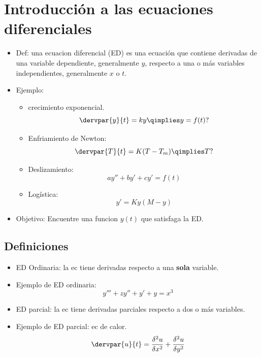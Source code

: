 \section{Introducción a las ecuaciones diferenciales}
\begin{itemize}
    \item Def: una ecuacion diferencial (ED) es una ecuación que contiene derivadas de una variable dependiente, generalmente $y$, respecto a una o más variables independientes, generalmente $x$ o $t$.
    \item Ejemplo: 
        \begin{itemize}
            \item crecimiento exponencial.
                \[
                    \dervpar{y}{t} = ky \qimplies y=f(t)?
                \]
            
            \item Enfriamiento de Newton:
                \[
                  \dervpar{T}{t} = K(T-T_m) \qimplies T?
                \]
            
            \item Deslizamiento: 
                \[
                  ay''+by'+cy'=f(t) 
                \]
            
            \item Logística: 
                \[
                  y'=Ky(M-y)
                \]
        \end{itemize}
    
    \item Objetivo: Encuentre una funcion $y(t)$ que satisfaga la ED.
\end{itemize}

\subsection{Definiciones}
\begin{itemize}
    \item ED Ordinaria: la ec tiene derivadas respecto a una \textbf{sola} variable.
    \item Ejemplo de ED ordinaria: 
        \[
          y'''+zy''+y'+y=x^3
        \]
    
    \item ED parcial: la ec tiene derivadas parciales respecto a dos o más variables.
    \item Ejemplo de ED parcial: ec de calor.
            \[
                \dervpar{u}{t} = \frac{\delta^2u}{\delta x^2} + \frac{\delta^2 u}{\delta y^2} 
            \]
\end{itemize}

